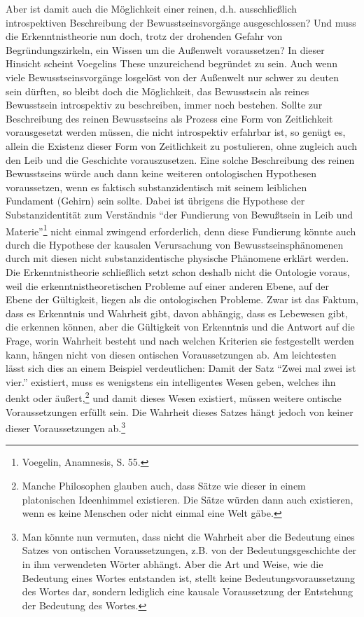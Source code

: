 Aber ist damit auch die Möglichkeit einer reinen, d.h. ausschließlich
introspektiven Beschreibung der Bewusstseinsvorgänge ausgeschlossen? Und muss
die Erkenntnistheorie nun doch, trotz der drohenden Gefahr von
Begründungszirkeln, ein Wissen um die Außenwelt voraussetzen? In dieser
Hinsicht scheint Voegelins These unzureichend begründet zu sein. Auch wenn
viele Bewusstseinsvorgänge losgelöst von der Außenwelt nur schwer zu deuten
sein dürften, so bleibt doch die Möglichkeit, das Bewusstsein als reines
Bewusstsein introspektiv zu beschreiben, immer noch bestehen. Sollte zur
Beschreibung des reinen Bewusstseins als Prozess eine Form von Zeitlichkeit
vorausgesetzt werden müssen, die nicht introspektiv erfahrbar ist, so genügt
es, allein die Existenz dieser Form von Zeitlichkeit zu postulieren, ohne
zugleich auch den Leib und die Geschichte vorauszusetzen. Eine solche
Beschreibung des reinen Bewusstseins würde auch dann keine weiteren
ontologischen Hypothesen voraussetzen, wenn es faktisch substanzidentisch mit
seinem leiblichen Fundament (Gehirn) sein sollte. Dabei ist übrigens die
Hypothese der Substanzidentität zum Verständnis "`der Fundierung von
Bewußtsein in Leib und Materie"'\footnote{Voegelin, Anamnesis, S. 55.} nicht
einmal zwingend erforderlich, denn diese Fundierung könnte auch durch die
Hypothese der kausalen Verursachung von Bewusstseinsphänomenen durch mit
diesen nicht substanzidentische physische Phänomene erklärt werden. Die
Erkenntnistheorie schließlich setzt schon deshalb nicht die Ontologie voraus,
weil die erkenntnistheoretischen Probleme auf einer anderen Ebene, auf der
Ebene der Gültigkeit, liegen als die ontologischen Probleme. Zwar ist das
Faktum, dass es Erkenntnis und Wahrheit gibt, davon abhängig, dass es
Lebewesen gibt, die erkennen können, aber die Gültigkeit von Erkenntnis und
die Antwort auf die Frage, worin Wahrheit besteht und nach welchen Kriterien
sie festgestellt werden kann, hängen nicht von diesen ontischen
Voraussetzungen ab. Am leichtesten lässt sich dies an einem Beispiel
verdeutlichen: Damit der Satz "`Zwei mal zwei ist vier."' existiert, muss es
wenigstens ein intelligentes Wesen geben, welches ihn denkt oder
äußert,\footnote{Manche Philosophen glauben auch, dass Sätze wie dieser in
  einem platonischen Ideenhimmel existieren. Die Sätze würden dann auch
  existieren, wenn es keine Menschen oder nicht einmal eine Welt gäbe.}  und
damit dieses Wesen existiert, müssen weitere ontische Voraussetzungen erfüllt
sein. Die Wahrheit dieses Satzes hängt jedoch von keiner dieser
Voraussetzungen ab.\footnote{Man könnte nun vermuten, dass nicht die Wahrheit
  aber die Bedeutung eines Satzes von ontischen Voraussetzungen, z.B. von der
  Bedeutungsgeschichte der in ihm verwendeten Wörter abhängt. Aber die Art und
  Weise, wie die Bedeutung eines Wortes entstanden ist, stellt keine
  Bedeutungsvoraussetzung des Wortes dar, sondern lediglich eine kausale
  Voraussetzung der Entstehung der Bedeutung des Wortes.}

